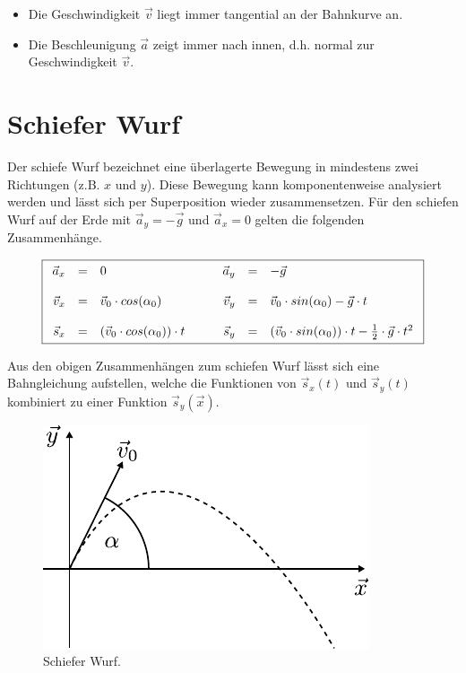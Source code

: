 \begin{itemize}
	\item Die Geschwindigkeit $\vec{v}$ liegt immer tangential an
		der Bahnkurve an.
	\item Die Beschleunigung $\vec{a}$ zeigt immer nach innen, 
		d.h. normal zur Geschwindigkeit $\vec{v}$.
\end{itemize}

\section{Schiefer Wurf}
Der schiefe Wurf bezeichnet eine überlagerte Bewegung in mindestens zwei
Richtungen (z.B. $x$ und $y$). Diese Bewegung kann komponentenweise 
analysiert werden und lässt sich per Superposition wieder zusammensetzen.
Für den schiefen Wurf auf der Erde mit $\vec{a}_y=-\vec{g}$ und 
$\vec{a}_x=0$ gelten die folgenden Zusammenhänge.

\[\boxed{\begin{array}{r c l  r c l}
	\vec{a}_x 
		&=& 0 
		& \qquad \vec{a}_y 
		&=& -\vec{g} \\
	 & & &  \\
	\vec{v}_x 
		&=& \vec{v}_0 \cdot cos(\alpha_0)
		& \vec{v}_y
		&=& \vec{v}_0 \cdot sin(\alpha_0) -\vec{g} \cdot t \\
	 & & & \\
	\vec{s}_x
		&=& \left( \vec{v}_0 \cdot cos(\alpha_0) \right) \cdot t
		& \vec{s}_y
		&=& \left( \vec{v}_0 \cdot sin(\alpha_0) \right) \cdot t 
			- \frac{1}{2} \cdot \vec{g} \cdot t^2
\end{array}}\]

\noindent
Aus den obigen Zusammenhängen zum schiefen Wurf lässt sich eine 
Bahngleichung aufstellen, welche die Funktionen von $\vec{s}_x(t)$ und
$\vec{s}_y(t)$ kombiniert zu einer Funktion $\vec{s}_y(\vec{x})$.

\begin{figure}[h!]
	\centering
	\includegraphics[scale=0.8]{wurf.pdf}
	\caption{Schiefer Wurf.}
	\label{fig:wurf}
\end{figure}

